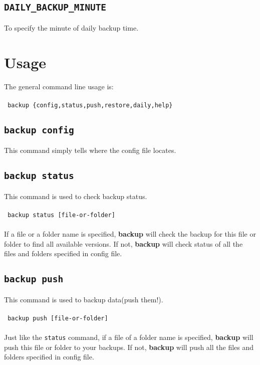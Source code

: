 \documentclass[a4paper]{article}
\begin{document}
\subsection{{\large\tt DAILY\_BACKUP\_MINUTE}}
To specify the minute of daily backup time.

\section{Usage}
The general command line usage is: \\
\\
{\tt
    backup \{config,status,push,restore,daily,help\}
}

\subsection{{\large\tt backup config}}
This command simply tells where the config file locates.

\subsection{{\large\tt backup status}}
This command is used to check backup status. \\
\\
{\tt
    backup status [file-or-folder]
} \\
\\
If a file or a folder name is specified, \textbf{backup} will check the backup for this file or folder to find all available versions. If not, \textbf{backup} will check status of all the files and folders specified in config file.

\subsection{{\large\tt backup push}}
This command is used to backup data(push them!). \\
\\
{\tt
    backup push [file-or-folder]
} \\
\\
Just like the {\large\tt status} command, if a file of a folder name is specified, \textbf{backup} will push this file or folder to your backups. If not, \textbf{backup} will push all the files and folders specified in config file.
\end{document}
